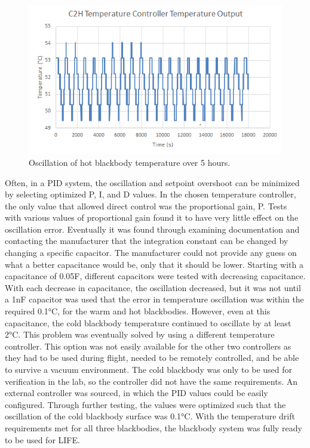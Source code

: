 \begin{figure}
    \centering
    \includegraphics{chap3_images/C2H_temperature_oscillation_excel.png}
    \caption{Oscillation of hot blackbody temperature over 5 hours.}
    \label{fig:C2H_temp_oscillation}
\end{figure}

Often, in a PID system, the oscillation and setpoint overshoot can be minimized by selecting optimized P, I, and D values. In the chosen temperature controller, the only value that allowed direct control was the proportional gain, P. Tests with various values of proportional gain found it to have very little effect on the oscillation error. Eventually it was found through examining documentation and contacting the manufacturer that the integration constant can be changed by changing a specific capacitor. The manufacturer could not provide any guess on what a better capacitance would be, only that it should be lower. Starting with a capacitance of 0.05{\textmu}F, different capacitors were tested with decreasing capacitance. With each decrease in capacitance, the oscillation decreased, but it was not until a 1nF capacitor was used that the error in temperature oscillation was within the required 0.1°C, for the warm and hot blackbodies. However, even at this capacitance, the cold blackbody temperature continued to oscillate by at least 2°C. This problem was eventually solved by using a different temperature controller. This option was not easily available for the other two controllers as they had to be used during flight, needed to be remotely controlled, and be able to survive a vacuum environment. The cold blackbody was only to be used for verification in the lab, so the controller did not have the same requirements. An external controller was sourced, in which the PID values could be easily configured. Through further testing, the values were optimized such that the oscillation of the cold blackbody surface was 0.1°C. With the temperature drift requirements met for all three blackbodies, the blackbody system was fully ready to be used for LIFE.

